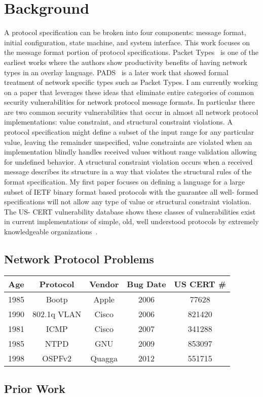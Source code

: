 \section{Background}
     
A protocol specification can be broken into four components: message format,
initial configuration, state machine, and system interface. 
This work focuses on the message format
portion of protocol specifications. Packet Types~\cite{packet_types} is one of the earliest
works where the authors show productivity benefits of having network types in an
overlay language. PADS~\cite{pads_ml} is a later work that showed formal treatment of 
network specific types such as Packet Types. I am currently working on a paper
that leverages these ideas that eliminate entire categories of common security
vulnerabilities for network protocol message formats. In particular there are
two common security vulnerabilities that occur in almost all network protocol
implementations: value constraint, and structural constraint violations. A
protocol specification might define a subset of the input range for any
particular value, leaving the remainder unspecified, value constraints are
violated when an implementation blindly handles received values without range
validation allowing for undefined behavior. A structural constraint violation
occurs when a received message describes its structure in a way that violates
the structural rules of the format specification. My first paper focuses on
defining a language for a large subset of IETF binary format based protocols
with the guarantee all well- formed specifications will not allow any type of
value or structural constraint violation. The US- CERT vulnerability database
shows these classes of vulnerabilities exist in current implementations of
simple, old, well understood protocols by extremely knowledgeable organizations~\cite{us_cert}.

\subsection{Network Protocol Problems }

\begin{tabular}{|c|c|c|c|c|}
   \hline
   Age & Protocol & Vendor & Bug Date & US CERT \# \\ \hline
   \hline
   1985 & Bootp & Apple & 2006 & 77628 \\ \hline
   1990 & 802.1q VLAN & Cisco & 2006 & 821420 \\ \hline
   1981 & ICMP & Cisco & 2007 & 341288 \\ \hline
   1985 & NTPD & GNU & 2009 & 853097 \\ \hline
   1998 & OSPFv2 & Quagga & 2012 & 551715 \\ \hline
\end{tabular}

\subsection{Prior Work}

